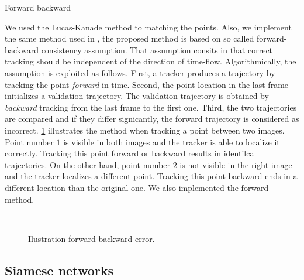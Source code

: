 Forward backward

We used the Lucas-Kanade method to matching the points. Also, we implement the same method used in \cite{medianFlow}, the proposed method is based on so called forward-backward consistency assumption. That assumption consits in that correct tracking should be independent of the direction of time-flow. Algorithmically, the assumption is exploited as follows. First, a tracker produces a trajectory by tracking the point \textit{forward} in time. Second, the point location in the last frame initializes a validation trajectory. The validation trajectory is obtained by \textit{backward} tracking from the last frame to the first one. Third, the two trajectories are compared and if they differ signicantly, the forward trajectory is considered as incorrect. \ref{motion23} illustrates the method when tracking a point between two images. Point number $1$  is visible in both images and the tracker is able to localize it correctly. Tracking this point forward or backward results in identilcal trajectories. On the other hand, point number $2$ is not visible in the right image and the tracker localizes a different point. Tracking this point backward ends in a different location than the original one. We also implemented the forward method.



\begin{figure}[H]
		
\centering

\\
\caption{Ilustration forward backward error.}
\label{motion23}
\end{figure}

\subsection{Siamese networks}


